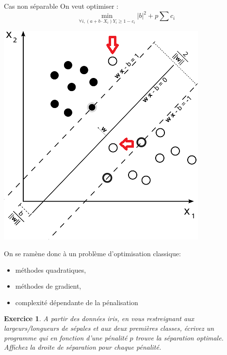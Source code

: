 \documentclass[11pt]{beamer}
\newtheorem{exercice}{Exercice}
\begin{document}
\begin{frame}{Cas non séparable}
On veut optimiser :
$$\min_{\forall i, (a+b\cdot X_i)Y_i \geq 1-c_i} |b|^2+p\sum c_i$$
\end{frame}

\begin{frame}
\includegraphics[scale=0.6]{relax}
\end{frame}

\begin{frame}
On se ramène donc à un problème d'optimisation classique:\\ \vspace{0.3cm}
\begin{itemize}
	\item méthodes quadratiques,
	\item méthodes de gradient,
	\item complexité dépendante de la pénalisation
\end{itemize}
\end{frame}

\begin{frame}
\begin{exercice}
A partir des données iris, en vous restreignant aux largeurs/longueurs de sépales et aux deux premières classes, écrivez un programme qui en fonction d'une pénalité $p$ trouve la séparation optimale. Affichez la droite de séparation pour chaque pénalité.
\end{exercice}
\end{frame}
\end{document}
